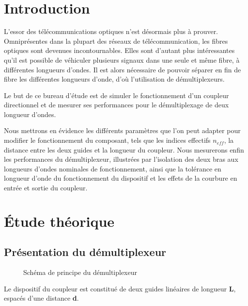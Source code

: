 \documentclass[a4paper,11pt]{report}
\begin{document}


\chapter*{Introduction}

L'essor des télécommunications optiques n'est désormais plus à prouver. Omniprésentes dans la plupart des réseaux de télécommunication, les fibres optiques sont devenues incontournables. Elles sont d'autant plus intéressantes qu'il est possible de véhiculer plusieurs signaux dans une seule et même fibre, à différentes longueurs d'ondes. \newline
Il est alors nécessaire de pouvoir séparer en fin de fibre les différentes longueurs d'onde, d'où l'utilisation de démultiplexeurs.

Le but de ce bureau d'étude est de simuler le fonctionnement d'un coupleur directionnel et de mesurer ses performances pour le démultiplexage de deux longueur d'ondes.

Nous mettrons en évidence les différents paramètres que l'on peut adapter pour modifier le fonctionnement du composant, tels que les indices effectifs $n_{eff}$, la distance entre les deux guides et la longueur du coupleur.
\newline
\indent Nous mesurerons enfin les performances du démultiplexeur, illustrées par l'isolation des deux bras aux longueurs d'ondes nominales de fonctionnement, ainsi que la tolérance en longueur d'onde du fonctionnement du dispositif et les effets de la courbure en entrée et sortie du coupleur.


\chapter{Étude théorique}

\section{Présentation du démultiplexeur}
\begin{figure}[h]
    \begin{center}
        
        \caption{Schéma de principe du démultiplexeur}
        \label{fig:}
    \end{center}
\end{figure}

Le dispositif du coupleur est constitué de deux guides linéaires de longueur \textbf{L}, espacés d'une distance \textbf{d}.
\end{document}
